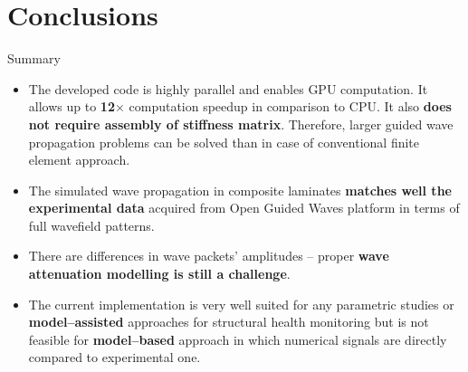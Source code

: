 \documentclass[10pt]{beamer} %
\begin{document}
\section{Conclusions}
\begin{frame}{Summary}
	\begin{itemize}
		\item The developed code is highly parallel and enables GPU computation. It allows up to \textbf{12$\times$} computation speedup in comparison to CPU. It also \textbf{does not require assembly of stiffness matrix}. Therefore, larger guided wave propagation problems can be solved than in case of conventional finite element approach.
		\item The simulated wave propagation in composite laminates \textbf{matches well the experimental data} acquired from Open Guided Waves platform in terms of full wavefield patterns.
		\item There are differences in wave packets' amplitudes -- proper \textbf{wave attenuation modelling is still a challenge}.
		\item The current implementation is very well suited for any parametric studies or \textbf{model--assisted} approaches for structural health monitoring but is not feasible for \textbf{model--based} approach in which numerical signals are directly compared to experimental one.
		
	\end{itemize}	
\end{frame}
\end{document}
